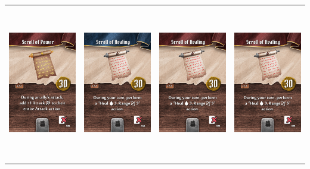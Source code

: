 \documentclass{minimal}
\begin{document}
{\begin{longtable}{llll}
\includegraphics[width=44mm,height=68mm]{./64-151/gh-093b-scroll-of-power.png} &
\includegraphics[width=44mm,height=68mm]{./64-151/gh-094a-scroll-of-healing.png} &
\includegraphics[width=44mm,height=68mm]{./64-151/gh-094b-scroll-of-healing.png} &
\includegraphics[width=44mm,height=68mm]{./64-151/gh-094b-scroll-of-healing.png}\\ 

\end{longtable}}
\end{document}

